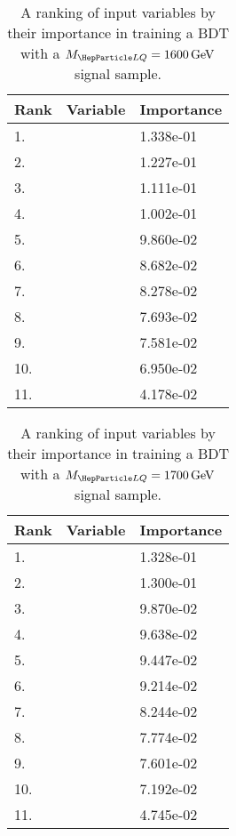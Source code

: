 \begin{table}[H]
	\caption{A ranking of input variables by their importance in training a BDT with a $\MLQ = \SI{1600}{GeV}$ signal sample.}
	\begin{center}
		\begin{tabular}{lll} \hline \hline
			Rank & Variable & Importance  \\ \hline
			1. & \MujTwo & 1.338e-01 \\
			2. & \ST & 1.227e-01 \\
			3. & \ptof{\PjTwo} & 1.111e-01 \\
			4. & \Muujj & 1.002e-01 \\
			5. & \MujOne & 9.860e-02 \\
			6. & \ptof{\PmuTwo} & 8.682e-02 \\
			7. & \ptof{\PmuOne} & 8.278e-02 \\
			8. & \Muu & 7.693e-02 \\
			9. & \ptof{\PjOne} & 7.581e-02 \\
			10. & \DRof{\PmuOne+\PmuTwo}{\PjOne} & 6.950e-02 \\
			11. & \MET & 4.178e-02 \\ \hline \hline
		\end{tabular}
		\label{tab:bdtRank1600}
	\end{center}
\end{table}

\begin{table}[H]
	\caption{A ranking of input variables by their importance in training a BDT with a $\MLQ = \SI{1700}{GeV}$ signal sample.}
	\begin{center}
		\begin{tabular}{lll} \hline \hline
			Rank & Variable & Importance  \\ \hline
			1. & \MujTwo & 1.328e-01 \\
			2. & \ST & 1.300e-01 \\
			3. & \MujOne & 9.870e-02 \\
			4. & \Muujj & 9.638e-02 \\
			5. & \ptof{\PmuTwo} & 9.447e-02 \\
			6. & \Muu & 9.214e-02 \\
			7. & \ptof{\PjTwo} & 8.244e-02 \\
			8. & \ptof{\PmuOne} & 7.774e-02 \\
			9. & \ptof{\PjOne} & 7.601e-02 \\
			10. & \DRof{\PmuOne+\PmuTwo}{\PjOne} & 7.192e-02 \\
			11. & \MET & 4.745e-02 \\ \hline \hline
		\end{tabular}
		\label{tab:bdtRank1700}
	\end{center}
\end{table}

